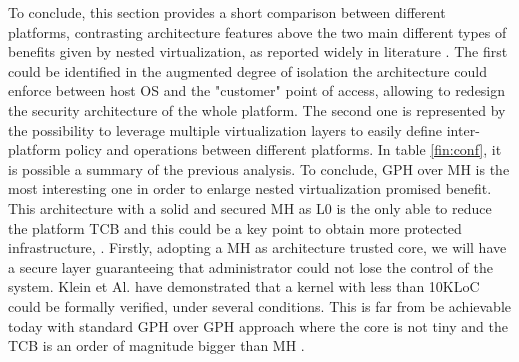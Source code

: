 \documentclass{sig-alternate}
\begin{document}
To conclude, this section provides a short comparison between different platforms, contrasting architecture features above the two main different types of benefits given by nested virtualization, as reported widely in literature \cite{art:blan, nested:berghmans,  cloudvisor:zhang, turtle:ibm}. The first could be identified in the augmented degree of isolation the architecture could enforce between host OS and the "customer" point of access, allowing to redesign the security architecture of the whole platform. The second one is represented by the possibility to leverage multiple virtualization layers to easily define inter-platform policy and operations between different platforms.
In table \ref{fin:conf}, it is possible a summary of the previous analysis. To conclude, GPH over MH is the most interesting one in order to enlarge nested virtualization promised benefit. This architecture with a solid and secured MH as L0 is the only able to reduce the platform TCB and this could be a key point to obtain more protected infrastructure, .
Firstly, adopting a MH as architecture trusted core, we will have a secure layer guaranteeing that administrator could not lose the control of the system. Klein et Al. \cite{Klein:2009} have demonstrated that a kernel with less than 10KLoC could be formally verified, under several conditions. This is far from be achievable today with standard GPH over GPH approach where the core is not tiny and the TCB is an order of 
magnitude bigger than MH \cite{nova}. 
\end{document}

